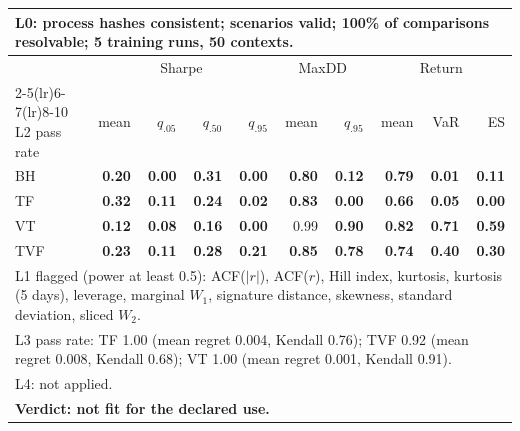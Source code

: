 \begin{tabular}{lrrrrrrrrr}
\toprule
\multicolumn{10}{p{13.5cm}}{L0: process hashes consistent; scenarios valid; 100\% of comparisons resolvable; 5 training runs, 50 contexts.} \\
\midrule
 & \multicolumn{4}{c}{Sharpe} & \multicolumn{2}{c}{MaxDD} & \multicolumn{3}{c}{Return} \\
\cmidrule(lr){2-5}\cmidrule(lr){6-7}\cmidrule(lr){8-10}
L2 pass rate & mean & $q_{.05}$ & $q_{.50}$ & $q_{.95}$ & mean & $q_{.95}$ & mean & VaR & ES \\
\midrule
BH & \textbf{0.20} & \textbf{0.00} & \textbf{0.31} & \textbf{0.00} & \textbf{0.80} & \textbf{0.12} & \textbf{0.79} & \textbf{0.01} & \textbf{0.11} \\
TF & \textbf{0.32} & \textbf{0.11} & \textbf{0.24} & \textbf{0.02} & \textbf{0.83} & \textbf{0.00} & \textbf{0.66} & \textbf{0.05} & \textbf{0.00} \\
VT & \textbf{0.12} & \textbf{0.08} & \textbf{0.16} & \textbf{0.00} & 0.99 & \textbf{0.90} & \textbf{0.82} & \textbf{0.71} & \textbf{0.59} \\
TVF & \textbf{0.23} & \textbf{0.11} & \textbf{0.28} & \textbf{0.21} & \textbf{0.85} & \textbf{0.78} & \textbf{0.74} & \textbf{0.40} & \textbf{0.30} \\
\midrule
\multicolumn{10}{p{13.5cm}}{L1 flagged (power at least 0.5): ACF($|r|$), ACF($r$), Hill index, kurtosis, kurtosis (5 days), leverage, marginal $W_1$, signature distance, skewness, standard deviation, sliced $W_2$.} \\
\multicolumn{10}{p{13.5cm}}{L3 pass rate: TF 1.00 (mean regret 0.004, Kendall 0.76); TVF 0.92 (mean regret 0.008, Kendall 0.68); VT 1.00 (mean regret 0.001, Kendall 0.91).} \\
\multicolumn{10}{p{13.5cm}}{L4: not applied.} \\
\multicolumn{10}{p{13.5cm}}{\textbf{Verdict: not fit for the declared use.}} \\
\bottomrule
\end{tabular}
